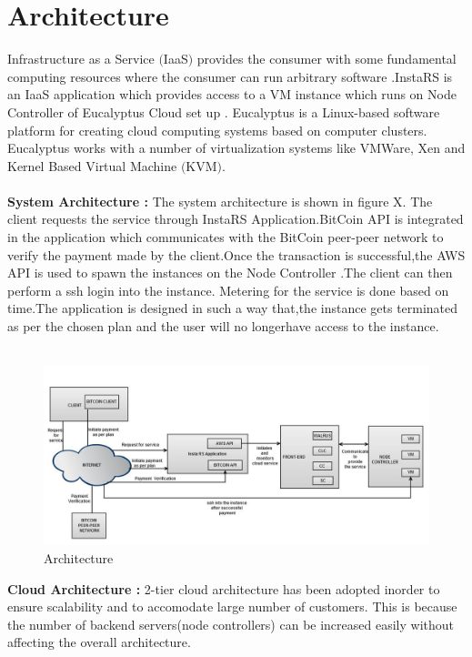 \documentclass[a4page,12pt]{article}
\begin{document}
\section{Architecture}
Infrastructure as a Service $($IaaS$)$ provides the consumer with some fundamental computing resources where the  consumer can run arbitrary software .InstaRS is an IaaS application which provides access to a VM instance which runs on Node Controller of Eucalyptus Cloud set up . Eucalyptus is a Linux-based software platform for creating cloud computing systems based on computer clusters. Eucalyptus works with a number of virtualization systems like VMWare, Xen and Kernel Based Virtual Machine $($KVM$)$.\\\\
\textbf{System Architecture :}
The system architecture is shown in figure X. The client requests the service through InstaRS Application.BitCoin API is integrated in the application which communicates with the BitCoin peer-peer network to verify the payment made by the client.Once the transaction is successful,the AWS API is used to  spawn the instances on the Node Controller .The client can then perform a ssh login into the instance. Metering for the service is done based on time.The application is designed in such a way that,the instance gets terminated as per the chosen plan and the user will no longerhave access to the instance.\\\\
\begin{figure}[hbtp]
\includegraphics[scale=0.35]{images/Architecture.jpg}
\caption{Architecture}
\end{figure}
\textbf{Cloud Architecture :}
2-tier cloud architecture has been adopted inorder to ensure  scalability and to accomodate large number of customers. This is because the number of backend servers(node controllers) can be increased easily without affecting the overall architecture.\\
\end{document}
